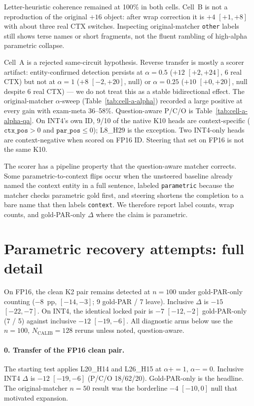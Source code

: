 \documentclass{article} %
\begin{document}
Letter-heuristic coherence remained at 100\% in both cells. Cell~B is not a reproduction of the original $+16$ object: after wrap correction it is $+4$ $[+1,+8]$ with about three real CTX switches. Inspecting original-matcher \texttt{other} labels still shows terse names or short fragments, not the fluent rambling of high-alpha parametric collapse.

Cell~A is a rejected same-circuit hypothesis. Reverse transfer is mostly a scorer artifact: entity-confirmed detection persists at $\alpha{=}0.5$ ($+12$ $[+2,+24]$, 6 real CTX) but not at $\alpha{=}1$ ($+8$ $[-2,+20]$, null) or $\alpha{=}0.25$ ($+10$ $[+0,+20]$, null despite 6 real CTX) --- we do not treat this as a stable bidirectional effect. The original-matcher $\alpha$-sweep (Table~\ref{tab:cell-a-alpha}) recorded a large positive at every gain with exam-meta 36--58\%. Question-aware P/C/O is Table~\ref{tab:cell-a-alpha-qa}. On INT4's own ID, 9/10 of the native K10 heads are context-specific ($\texttt{ctx\_pos}{>}0$ and $\texttt{par\_pos}{\le}0$); L8\_H29 is the exception. Two INT4-only heads are context-negative when scored on FP16 ID. Steering that set on FP16 is not the same K10.

The scorer has a pipeline property that the question-aware matcher corrects. Some parametric-to-context flips occur when the unsteered baseline already named the context entity in a full sentence, labeled \texttt{parametric} because the matcher checks parametric gold first, and steering shortens the completion to a bare name that then labels \texttt{context}. We therefore report label counts, wrap counts, and gold-PAR-only $\Delta$ where the claim is parametric.

\section{Parametric recovery attempts: full detail}
\label{app:parametric}

On FP16, the clean K2 pair remains detected at $n{=}100$ under gold-PAR-only counting ($-8$~pp, $[-14,-3]$; 9 gold-PAR / 7 leave). Inclusive $\Delta$ is $-15$ $[-22,-7]$. On INT4, the identical locked pair is $-7$ $[-12,-2]$ gold-PAR-only (7 / 5) against inclusive $-12$ $[-19,-6]$. All diagnostic arms below use the $n{=}100$, $N_{\mathrm{CALIB}}{=}128$ reruns unless noted, question-aware.

\paragraph{0. Transfer of the FP16 clean pair.}
The starting test applies L20\_H14 and L26\_H15 at $\alpha{+}{=}1$, $\alpha{-}{=}0$. Inclusive INT4 $\Delta$ is $-12$ $[-19,-6]$ (P/C/O 18/62/20). Gold-PAR-only is the headline. The original-matcher $n{=}50$ result was the borderline $-4$ $[-10,0]$ null that motivated expansion.
\end{document}
